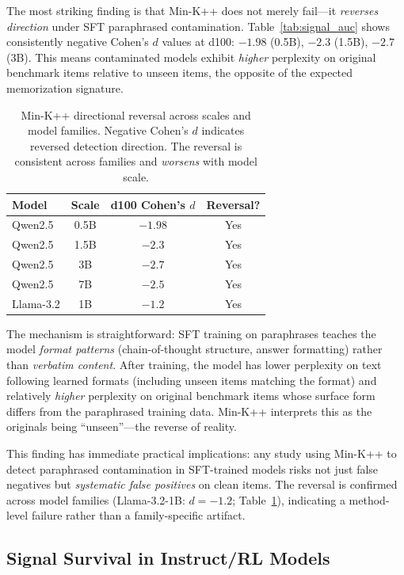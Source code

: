\documentclass[11pt]{article}
\begin{document}
The most striking finding is that Min-K++ does not merely fail---it \emph{reverses direction} under SFT paraphrased contamination.
Table~\ref{tab:signal_auc} shows consistently negative Cohen's $d$ values at d100: $-1.98$ (0.5B), $-2.3$ (1.5B), $-2.7$ (3B).
This means contaminated models exhibit \emph{higher} perplexity on original benchmark items relative to unseen items, the opposite of the expected memorization signature.

\begin{table}[t]
\centering
\caption{Min-K++ directional reversal across scales and model families.
Negative Cohen's $d$ indicates reversed detection direction.
The reversal is consistent across families and \emph{worsens} with model scale.}
\label{tab:minkpp_reversal}
\small
\begin{tabular}{lccc}
\toprule
Model & Scale & d100 Cohen's $d$ & Reversal? \\
\midrule
Qwen2.5 & 0.5B & $-1.98$ & Yes \\
Qwen2.5 & 1.5B & $-2.3$ & Yes \\
Qwen2.5 & 3B & $-2.7$ & Yes \\
Qwen2.5 & 7B & $-2.5$ & Yes \\
Llama-3.2 & 1B & $-1.2$ & Yes \\
\bottomrule
\end{tabular}
\end{table}

The mechanism is straightforward: SFT training on paraphrases teaches the model \emph{format patterns} (chain-of-thought structure, answer formatting) rather than \emph{verbatim content}.
After training, the model has lower perplexity on text following learned formats (including unseen items matching the format) and relatively \emph{higher} perplexity on original benchmark items whose surface form differs from the paraphrased training data.
Min-K++ interprets this as the originals being ``unseen''---the reverse of reality.

This finding has immediate practical implications: any study using Min-K++ to detect paraphrased contamination in SFT-trained models risks not just false negatives but \emph{systematic false positives} on clean items.
The reversal is confirmed across model families (Llama-3.2-1B: $d = -1.2$; Table~\ref{tab:minkpp_reversal}), indicating a method-level failure rather than a family-specific artifact.


\subsection{Signal Survival in Instruct/RL Models}
\label{sec:signal_rl}
\end{document}

